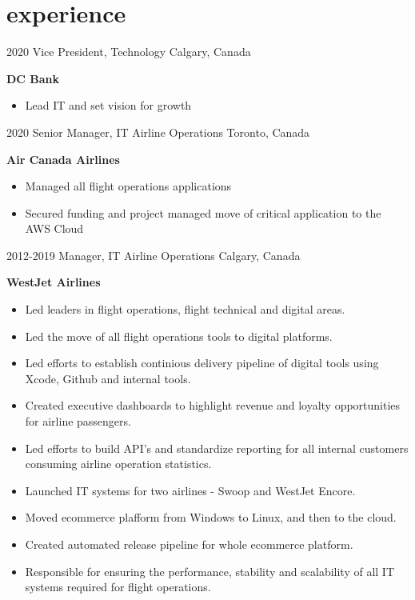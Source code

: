 \section{experience}

\begin{entrylist}
  \entry
    {2020}
    {Vice President, Technology}
    {Calgary, Canada}
    {
      \textbf{DC Bank}
      \begin{itemize}
        \item Lead IT and set vision for growth 
      \end{itemize}
    }
  \entry
    {2020}
    {Senior Manager, IT Airline Operations}
    {Toronto, Canada}
    {
      \textbf{Air Canada Airlines}
      \begin{itemize}
        \item Managed all flight operations applications 
	\item Secured funding and project managed move of critical application to the AWS Cloud 
      \end{itemize}
    }
  \entry
    {2012-2019}
    {Manager, IT Airline Operations}
    {Calgary, Canada}
    {
      \textbf{WestJet Airlines}
      \begin{itemize}
        \item Led leaders in flight operations, flight technical and digital areas. 
        \item Led the move of all flight operations tools to digital platforms.
        \item Led efforts to establish continious delivery pipeline of digital tools using Xcode, Github and internal tools. 
        \item Created executive dashboards to highlight revenue and loyalty opportunities for airline passengers.  
        \item Led efforts to build API's and standardize reporting for all internal customers consuming airline operation statistics. 
        \item Launched IT systems for two airlines - Swoop and WestJet Encore.
        \item Moved ecommerce plafform from Windows to Linux, and then to the cloud.
        \item Created automated release pipeline for whole ecommerce platform. 
        \item Responsible for ensuring the performance, stability and scalability of all IT systems required for flight operations. 
      \end{itemize}
}
\end{entrylist}
